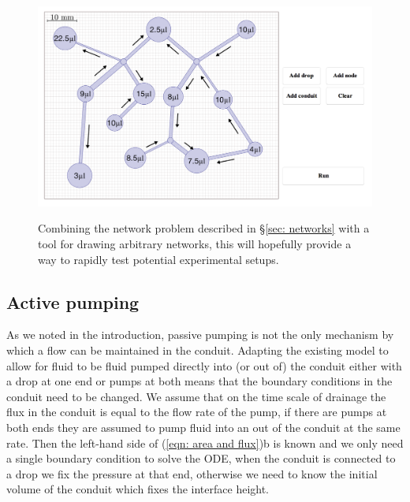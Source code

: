 \documentclass{jfm}
\begin{document}
\begin{figure} 
\centering
 {\includegraphics[width=1\linewidth]{Figures/GUI_example2.png}}  
  \caption{ 
  Combining the  network problem described in \S \ref{sec: networks} with a tool for drawing arbitrary    networks, this   will hopefully provide a way to rapidly test potential experimental setups.
  }   \label{fig: GUI}
\end{figure}


\subsection{Active pumping}
As we noted in the introduction, passive pumping is not the only mechanism by which a flow can be maintained in the conduit.
Adapting the existing model to allow for fluid to be fluid   pumped directly into (or out of) the conduit either with a drop at one end or pumps at both  means that the boundary conditions in the conduit need to be changed.
We assume that on the time scale of drainage  the flux in the conduit is equal to the flow rate of the pump, if there are pumps at both ends they are  assumed to pump fluid into an out of the conduit at the same rate.
 Then the left-hand side of (\ref{eqn: area and flux})b is known and we only need a single boundary condition to solve the ODE, when the conduit is connected to a drop we fix the pressure at that end, otherwise we need to know the initial volume of the conduit which fixes the interface height. 




\end{document}
